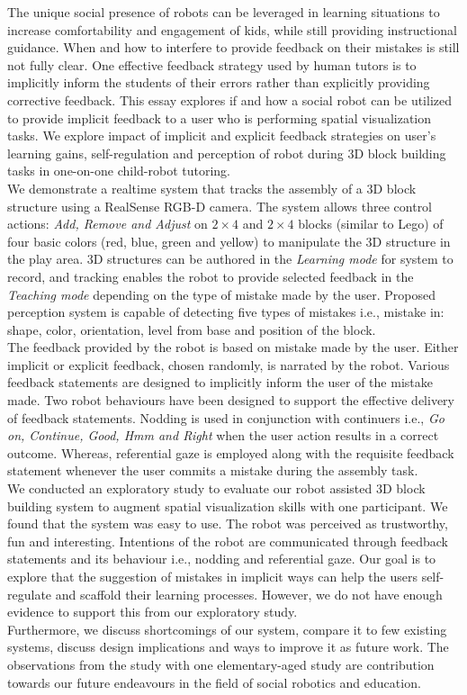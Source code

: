 %
The unique social presence of robots can be leveraged in learning situations to increase comfortability and engagement of kids, while still providing instructional guidance. When and how to interfere to provide feedback on their mistakes is still not fully clear. One effective feedback strategy used by human tutors is to implicitly inform the students of their errors rather than explicitly providing corrective feedback. This essay explores if and how a social robot can be utilized to provide implicit feedback to a user who is performing spatial visualization tasks. We explore impact of implicit and explicit feedback strategies on user's learning gains, self-regulation and perception of robot during 3D block building tasks in one-on-one child-robot tutoring.\\
We demonstrate a realtime system that tracks the assembly of a 3D block structure using a RealSense\textsuperscript\textregistered{} RGB-D camera. The system allows three control actions: \emph{Add, Remove and Adjust} on $2 \times 4 $ and $2 \times 4 $ blocks (similar to Lego\textsuperscript\textregistered{}) of four basic colors (red, blue, green and yellow) to manipulate the 3D structure in the play area. 3D structures can be authored in the \emph{Learning mode} for system to record, and tracking enables the robot to provide selected feedback in the \emph{Teaching mode} depending on the type of mistake made by the user. Proposed perception system is capable of detecting five types of mistakes i.e., mistake in: shape, color, orientation, level from base and position of the block.\\
The feedback provided by the robot is based on mistake made by the user. Either implicit or explicit feedback, chosen randomly, is narrated by the robot. Various feedback statements are designed to implicitly inform the user of the mistake made. Two robot behaviours have been designed to support the effective delivery of feedback statements. Nodding is used in conjunction with continuers i.e., \emph{Go on, Continue, Good, Hmm and Right} when the user action results in a correct outcome. Whereas, referential gaze is employed along with the requisite feedback statement whenever the user commits a mistake during the assembly task. \\
We conducted an exploratory study to evaluate our robot assisted 3D block building system to augment spatial visualization skills with one participant. We found that the system was easy to use. The robot was perceived as trustworthy, fun and interesting. Intentions of the robot are communicated through feedback statements and its behaviour i.e., nodding and referential gaze. Our goal is to explore that the suggestion of mistakes in implicit ways can help the users self-regulate and scaffold their learning processes. However, we do not have enough evidence to support this from our exploratory study. \\
Furthermore, we discuss shortcomings of our system, compare it to few existing systems, discuss design implications and ways to improve it as future work. The observations from the study with one elementary-aged study are contribution towards our future endeavours in the field of social robotics and education. 
%

